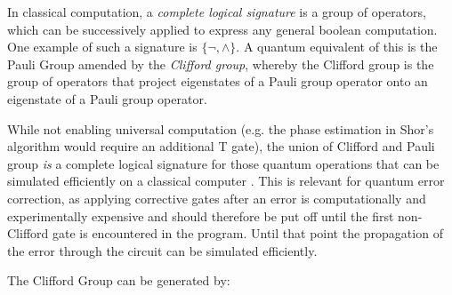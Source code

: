 In classical computation, a \emph{complete logical signature} is a group of
operators, which can be successively applied to express any general boolean 
computation. One example of such a signature is $\{\neg, \land\}$. 
A quantum equivalent of this is the Pauli Group amended by the 
\emph{Clifford group}, 
whereby the Clifford group is the group of operators that project eigenstates
of a Pauli group operator onto an eigenstate of a Pauli group operator.

While not enabling universal computation (e.g. the phase 
estimation in Shor's algorithm \cite{shor} would require an additional T gate),
the union of Clifford and Pauli group \emph{is} a complete logical signature for those quantum
operations that can be simulated efficiently on a classical computer
\cite{gottesmanFaultTolerant}.
This is relevant for quantum error correction, as applying corrective gates after
an error is computationally and experimentally expensive and should therefore be put
off until the first non-Clifford gate is encountered in the program.
Until that point the propagation of the error through the circuit can be simulated
efficiently.

The Clifford Group can be generated by:

